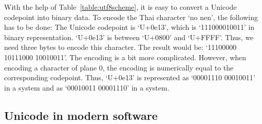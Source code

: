 \documentclass[a4paper, 12pt]{scrartcl} %
\begin{document}
With the help of Table~\ref{table:utf8scheme}, it is easy to convert a Unicode
\gls{codepoint} into  binary data. To encode the Thai
character `no nen', the following has to be done: The Unicode \gls{codepoint}
is `U+0e13', which is `111000010011' in binary representation. `U+0e13' is
between `U+0800' and `U+FFFF'. Thus, we need three bytes to encode this
character. The result would be: `11100000 10111000 10010011'. The
 encoding is a bit more complicated. However, when
encoding a character of \gls{plane} 0, the encoding is numerically equal to the
corresponding \gls{codepoint}. Thus, `U+0e13' is represented as `00001110
00010011' in a  system and as `00010011
00001110' in a  system.

\subsection{Unicode in modern software}
\end{document}

